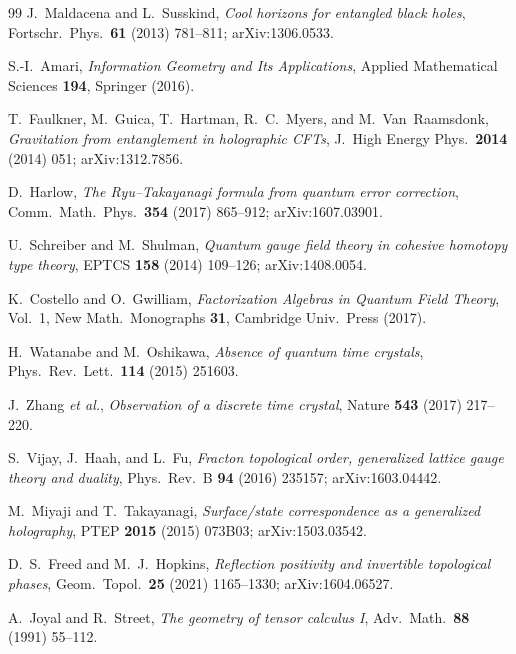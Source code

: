 \documentclass[12pt]{article}
\theoremstyle{definition}
\theoremstyle{remark}
\begin{document}
\begin{thebibliography}{99}
J.~Maldacena and L.~Susskind,
\emph{Cool horizons for entangled black holes},
Fortschr.\ Phys.\ \textbf{61} (2013) 781--811; arXiv:1306.0533.

S.-I.~Amari,
\emph{Information Geometry and Its Applications},
Applied Mathematical Sciences \textbf{194}, Springer (2016).

T.~Faulkner, M.~Guica, T.~Hartman, R.~C.~Myers, and M.~Van~Raamsdonk,
\emph{Gravitation from entanglement in holographic CFTs},
J.\ High Energy Phys.\ \textbf{2014} (2014) 051; arXiv:1312.7856.

D.~Harlow,
\emph{The Ryu--Takayanagi formula from quantum error correction},
Comm.\ Math.\ Phys.\ \textbf{354} (2017) 865--912; arXiv:1607.03901.

U.~Schreiber and M.~Shulman,
\emph{Quantum gauge field theory in cohesive homotopy type theory},
EPTCS \textbf{158} (2014) 109--126; arXiv:1408.0054.

K.~Costello and O.~Gwilliam,
\emph{Factorization Algebras in Quantum Field Theory}, Vol.~1,
New Math.\ Monographs \textbf{31}, Cambridge Univ.\ Press (2017).

H.~Watanabe and M.~Oshikawa,
\emph{Absence of quantum time crystals},
Phys.\ Rev.\ Lett.\ \textbf{114} (2015) 251603.

J.~Zhang \emph{et al.},
\emph{Observation of a discrete time crystal},
Nature \textbf{543} (2017) 217--220.

S.~Vijay, J.~Haah, and L.~Fu,
\emph{Fracton topological order, generalized lattice gauge theory and
  duality},
Phys.\ Rev.\ B \textbf{94} (2016) 235157; arXiv:1603.04442.

M.~Miyaji and T.~Takayanagi,
\emph{Surface/state correspondence as a generalized holography},
PTEP \textbf{2015} (2015) 073B03; arXiv:1503.03542.

D.~S.~Freed and M.~J.~Hopkins,
\emph{Reflection positivity and invertible topological phases},
Geom.\ Topol.\ \textbf{25} (2021) 1165--1330; arXiv:1604.06527.

A.~Joyal and R.~Street,
\emph{The geometry of tensor calculus I},
Adv.\ Math.\ \textbf{88} (1991) 55--112.

\end{thebibliography}
\end{document}
